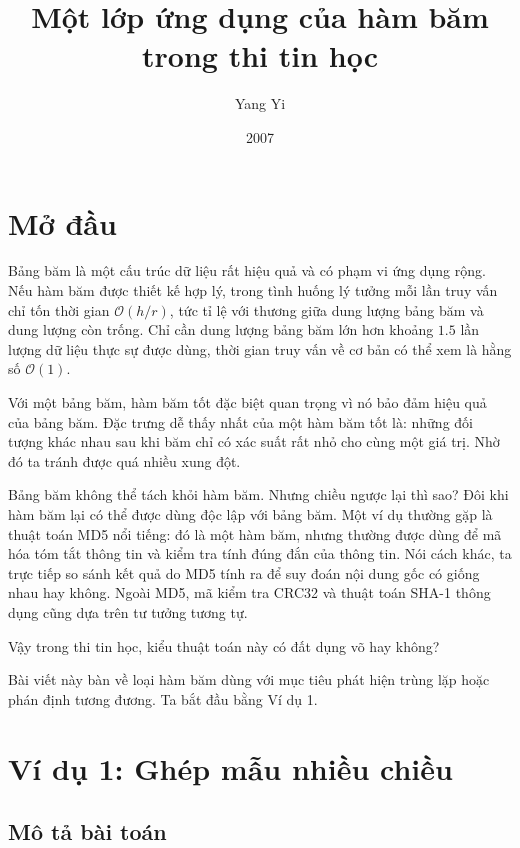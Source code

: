 \documentclass[11pt]{article}
\title{Một lớp ứng dụng của hàm băm trong thi tin học}
\author{Yang Yi}
\date{2007}
\newcommand{\Oh}{\mathcal{O}}
\begin{document}
\maketitle


\section*{Mở đầu}

Bảng băm là một cấu trúc dữ liệu rất hiệu quả và có phạm vi ứng dụng rộng.
Nếu hàm băm được thiết kế hợp lý, trong tình huống lý tưởng mỗi lần truy vấn
chỉ tốn thời gian $\Oh(h/r)$, tức tỉ lệ với thương giữa dung lượng bảng băm
và dung lượng còn trống. Chỉ cần dung lượng bảng băm lớn hơn khoảng $1.5$ lần
lượng dữ liệu thực sự được dùng, thời gian truy vấn về cơ bản có thể xem là
hằng số $\Oh(1)$.

Với một bảng băm, hàm băm tốt đặc biệt quan trọng vì nó bảo đảm hiệu quả của
bảng băm. Đặc trưng dễ thấy nhất của một hàm băm tốt là: những đối tượng
khác nhau sau khi băm chỉ có xác suất rất nhỏ cho cùng một giá trị. Nhờ đó ta
tránh được quá nhiều xung đột.

Bảng băm không thể tách khỏi hàm băm. Nhưng chiều ngược lại thì sao? Đôi khi
hàm băm lại có thể được dùng độc lập với bảng băm. Một ví dụ thường gặp là
thuật toán MD5 nổi tiếng: đó là một hàm băm, nhưng thường được dùng để mã hóa
tóm tắt thông tin và kiểm tra tính đúng đắn của thông tin. Nói cách khác, ta
trực tiếp so sánh kết quả do MD5 tính ra để suy đoán nội dung gốc có giống
nhau hay không. Ngoài MD5, mã kiểm tra CRC32 và thuật toán SHA-1 thông dụng
cũng dựa trên tư tưởng tương tự.

Vậy trong thi tin học, kiểu thuật toán này có đất dụng võ hay không?

Bài viết này bàn về loại hàm băm dùng với mục tiêu phát hiện trùng lặp hoặc
phán định tương đương. Ta bắt đầu bằng Ví dụ 1.

\section{Ví dụ 1: Ghép mẫu nhiều chiều}

\subsection{Mô tả bài toán}
\end{document}
